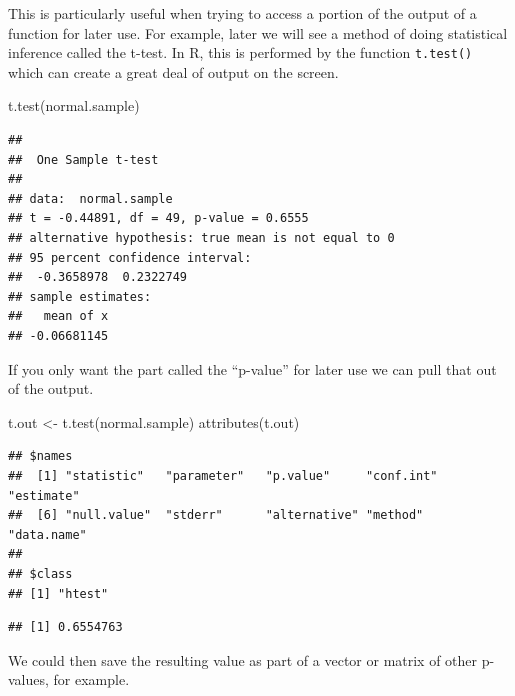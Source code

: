 \documentclass[
]{book}
\newenvironment{Shaded}{\begin{snugshade}}{\end{snugshade}}
\newcommand{\FunctionTok}[1]{\textcolor[rgb]{0.00,0.00,0.00}{#1}}
\newcommand{\NormalTok}[1]{#1}
\newcommand{\OtherTok}[1]{\textcolor[rgb]{0.56,0.35,0.01}{#1}}
\newcommand{\SpecialCharTok}[1]{\textcolor[rgb]{0.00,0.00,0.00}{#1}}
\begin{document}
This is particularly useful when trying to access a portion of the output of a function for later use. For example, later we will see a method of doing statistical inference called the t-test. In R, this is performed by the function \texttt{t.test()} which can create a great deal of output on the screen.

\begin{Shaded}
\begin{Highlighting}[]
\FunctionTok{t.test}\NormalTok{(normal.sample)}
\end{Highlighting}
\end{Shaded}

\begin{verbatim}
## 
##  One Sample t-test
## 
## data:  normal.sample
## t = -0.44891, df = 49, p-value = 0.6555
## alternative hypothesis: true mean is not equal to 0
## 95 percent confidence interval:
##  -0.3658978  0.2322749
## sample estimates:
##   mean of x 
## -0.06681145
\end{verbatim}

If you only want the part called the ``p-value'' for later use we can pull that out of the output.

\begin{Shaded}
\begin{Highlighting}[]
\NormalTok{t.out }\OtherTok{\textless{}{-}} \FunctionTok{t.test}\NormalTok{(normal.sample)}
\FunctionTok{attributes}\NormalTok{(t.out)}
\end{Highlighting}
\end{Shaded}

\begin{verbatim}
## $names
##  [1] "statistic"   "parameter"   "p.value"     "conf.int"    "estimate"   
##  [6] "null.value"  "stderr"      "alternative" "method"      "data.name"  
## 
## $class
## [1] "htest"
\end{verbatim}

\begin{Shaded}
\end{Shaded}

\begin{verbatim}
## [1] 0.6554763
\end{verbatim}

We could then save the resulting value as part of a vector or matrix of other p-values, for example.
\end{document}
